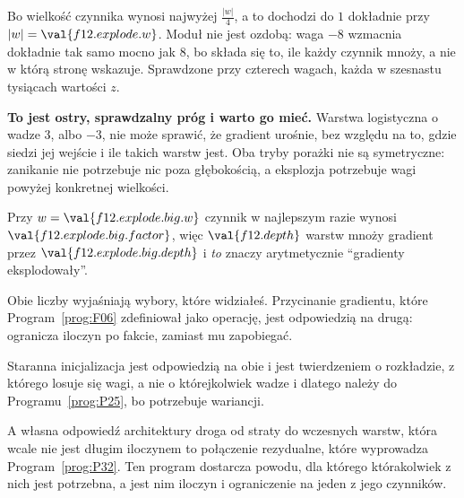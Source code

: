 \begin{fr}
Bo wielkość czynnika wynosi najwyżej $\frac{\lvert w \rvert}{4}$, a to dochodzi
do $1$ dokładnie przy $\lvert w \rvert = \val{f12.explode.w}$. Moduł nie jest
ozdobą: waga $-8$ wzmacnia dokładnie tak samo mocno jak $8$, bo składa się to,
ile każdy czynnik mnoży, a nie w którą stronę wskazuje. Sprawdzone przy
czterech wagach, każda w szesnastu tysiącach wartości $z$.

\textbf{To jest ostry, sprawdzalny próg i warto go mieć.} Warstwa logistyczna
o wadze $3$, albo $-3$, nie może sprawić, że gradient urośnie, bez względu na
to, gdzie siedzi jej wejście i ile takich warstw jest. Oba tryby porażki nie
są symetryczne: zanikanie nie potrzebuje nic poza głębokością, a eksplozja
potrzebuje wagi powyżej konkretnej wielkości.

Przy $w = \val{f12.explode.big.w}$ czynnik w najlepszym razie wynosi
$\val{f12.explode.big.factor}$, więc $\val{f12.depth}$ warstw mnoży gradient
przez $\val{f12.explode.big.depth}$ \dash{} i \emph{to} znaczy arytmetycznie
\enquote{gradienty eksplodowały}.

\begin{aibox}
Obie liczby wyjaśniają wybory, które widziałeś. Przycinanie gradientu, które
Program~\ref{prog:F06} zdefiniował jako operację, jest odpowiedzią na drugą:
ogranicza iloczyn po fakcie, zamiast mu zapobiegać.

Staranna inicjalizacja jest odpowiedzią na obie i jest twierdzeniem o
rozkładzie, z którego losuje się wagi, a nie o którejkolwiek wadze \dash{} i
dlatego należy do Programu~\ref{prog:P25}, bo potrzebuje wariancji.

A własna odpowiedź architektury \dash{} droga od straty do wczesnych warstw,
która wcale nie jest długim iloczynem \dash{} to połączenie rezydualne, które
wyprowadza Program~\ref{prog:P32}. Ten program dostarcza powodu, dla którego
którakolwiek z nich jest potrzebna, a jest nim iloczyn i ograniczenie na
jeden z jego czynników.
\end{aibox}
\end{fr}

